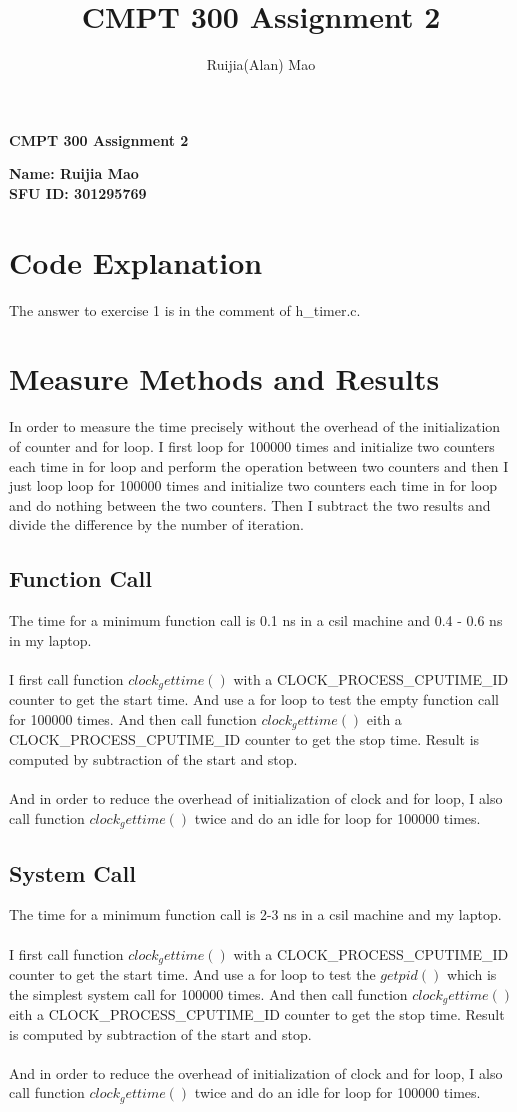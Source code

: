 \documentclass[a4paper,openany,10.5pt]{article}
\title{CMPT 300 Assignment 2}
\author{Ruijia(Alan) Mao}
\begin{document}
	\begin{center}
		\textbf{CMPT 300 Assignment 2 }
	\end{center}
	
	\begin{flushright}
		\textbf{Name: Ruijia Mao }\\
		\textbf{SFU ID: 301295769}
	\end{flushright}
	
	\section{Code Explanation}
	The answer to exercise 1 is in the comment of h\_timer.c.
	\section{Measure Methods and Results}
	In order to measure the time precisely without the overhead of the initialization of counter and for loop. I first loop for 100000 times and initialize two counters each time in for loop and perform the operation between two counters and then I just loop loop for 100000 times and initialize two counters each time in for loop and do nothing between the two counters. Then I subtract the two results and divide the difference by the number of iteration. 
	\subsection{Function Call}
	The time for a minimum function call is 0.1 ns in a csil machine and 0.4 - 0.6 ns in my laptop.
	\\ \\
	I first call function $clock_gettime()$ with a CLOCK\_PROCESS\_CPUTIME\_ID counter to get the start time. And use a for loop to test the empty function call for 100000 times. And then call  function $clock_gettime()$ eith a CLOCK\_PROCESS\_CPUTIME\_ID counter to get the stop time. Result is computed by subtraction of the start and stop. 
	\\ \\
	And in order to reduce the overhead of initialization of clock and for loop, I also call function $clock_gettime()$ twice and do an idle for loop for 100000 times.
	\subsection{System Call}
	The time for a minimum function call is 2-3 ns in a csil machine and my laptop.
	\\ \\
	I first call function $clock_gettime()$ with a CLOCK\_PROCESS\_CPUTIME\_ID counter to get the start time. And use a for loop to test the $getpid()$ which is the simplest system call for 100000 times. And then call  function $clock_gettime()$ eith a CLOCK\_PROCESS\_CPUTIME\_ID counter to get the stop time. Result is computed by subtraction of the start and stop. 
	\\ \\
	And in order to reduce the overhead of initialization of clock and for loop, I also call function $clock_gettime()$ twice and do an idle for loop for 100000 times.
\end{document}
